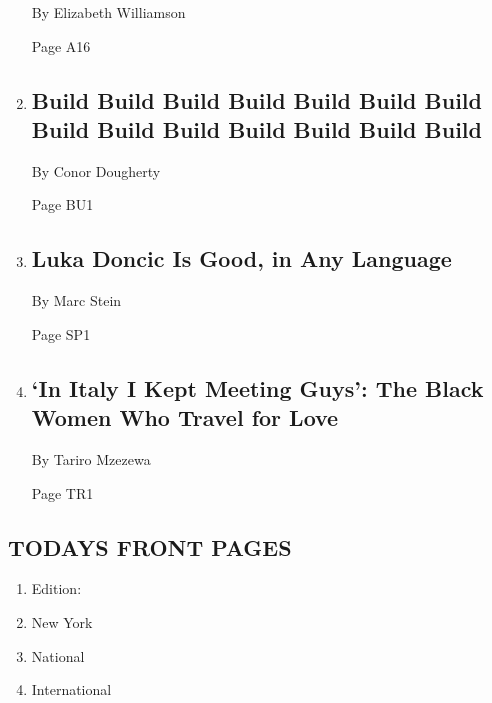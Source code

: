\begin{enumerate}
  By Elizabeth Williamson

  Page A16
\item
  \href{/2020/02/13/business/economy/housing-crisis-conor-dougherty-golden-gates.html}{}

  \hypertarget{build-build-build-build-build-build-build-build-build-build-build-build-build-build}{%
  \subsection{Build Build Build Build Build Build Build Build Build
  Build Build Build Build
  Build}\label{build-build-build-build-build-build-build-build-build-build-build-build-build-build}}

  By Conor Dougherty

  Page BU1
\item
  \href{/2020/02/15/sports/basketball/luka-doncic-kobe-all-star.html}{}

  \hypertarget{luka-doncic-is-good-in-any-language}{%
  \subsection{Luka Doncic Is Good, in Any
  Language}\label{luka-doncic-is-good-in-any-language}}

  By Marc Stein

  Page SP1
\item
  \href{/2020/02/14/travel/italy-black-women-love.html}{}

  \hypertarget{in-italy-i-kept-meeting-guys-the-black-women-who-travel-for-love}{%
  \subsection{`In Italy I Kept Meeting Guys': The Black Women Who Travel
  for
  Love}\label{in-italy-i-kept-meeting-guys-the-black-women-who-travel-for-love}}

  By Tariro Mzezewa

  Page TR1
\end{enumerate}

\hypertarget{todays-front-pages}{%
\subsection{TODAYS FRONT PAGES}\label{todays-front-pages}}

\begin{enumerate}
\def\labelenumi{\arabic{enumi}.}
\tightlist
\item
  Edition:
\item
  New York
\item
  National
\item
  International
\end{enumerate}

